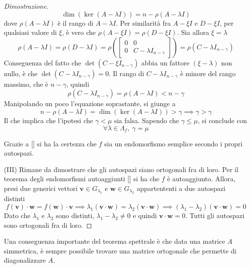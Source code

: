 \begin{proof}[Dimostrazione]
        \[
            \dim(\ker(A - \lambda I)) = n - \rho(A - \lambda I)
        \]
        dove $\rho(A - \lambda I)$ è il rango di $A - \lambda I$. Per similarità fra $A - \xi I$ e $D - \xi I$, per qualsiasi valore di $\xi$, è vero che $\rho(A - \xi I) = \rho(D - \xi I)$. Sia allora $\xi = \lambda$
        \[
            \rho(A - \lambda I) = \rho(D - \lambda I) = \rho\left(\begin{bmatrix}
                0 & 0 \\
                0 & C - \lambda I_{n - \gamma}
            \end{bmatrix}\right) = \rho(C - \lambda I_{n - \gamma})
        \]
        Conseguenza del fatto che $\det(C - \xi I_{n - \gamma})$ abbia un fattore $(\xi - \lambda)$ non nullo, è che $\det(C - \lambda I_{n - \gamma}) = 0$. Il rango di $C - \lambda I_{n-\gamma}$ è minore del rango massimo, che è $n - \gamma$, quindi
        \[
            \rho(C - \lambda I_{n - \gamma}) = \rho(A - \lambda I) < n - \gamma
        \]
        Manipolando un poco l'equazione soprastante, si giunge a
        \[
            n - \rho(A - \lambda I) = \dim(\ker(A - \lambda I)) > \gamma \implies \gamma > \gamma
        \]
        Il che implica che l'ipotesi che $\gamma < \mu$ sia falsa. Sapendo che $\gamma \leq \mu$, si conclude con
        \[
            \forall \lambda \in \Lambda_{f}, \; \gamma = \mu
        \]

        Grazie a [] si ha la certezza che $f$ sia un endomorfismo semplice secondo i propri autospazi.

        \vspace{10pt}
        (III) Rimane da dimostrare che gli autospazi siano ortogonali fra di loro. Per il teorema degli endomorfismi autoaggiunti [] si ha che $f$ è autoaggiunto. Allora, presi due generici vettori $\mathbf{v} \in G_{\lambda_1}$ e $\mathbf{w} \in G_{\lambda_2}$ appartententi a due autospazi distinti
        \[
            f(\mathbf{v}) \cdot \mathbf{w} = f(\mathbf{w}) \cdot \mathbf{v} \implies \lambda_1 (\mathbf{v} \cdot \mathbf{w}) = \lambda_2 (\mathbf{v} \cdot \mathbf{w}) \implies (\lambda_1 - \lambda_2)(\mathbf{v} \cdot \mathbf{w}) = 0
        \]
        Dato che $\lambda_1$ e $\lambda_2$ sono distinti, $\lambda_1 - \lambda_2 \neq 0$ e quindi $\mathbf{v} \cdot \mathbf{w} = 0$. Tutti gli autospazi sono ortogonali fra di loro.

    \end{proof}

    \vspace{10pt}
    Una conseguenza importante del teorema spettrale è che data una matrice $A$ simmetrica, è sempre possibile trovare una matrice ortogonale che permette di diagonalizzare $A$.
